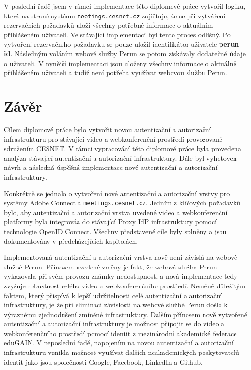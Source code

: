 \documentclass[
  printed, %
  twoside, %
  table,   %
  nolof,     %
  nolot,     %
]{fithesis3}
\begin{document}
V poslední řadě jsem v rámci implementace této diplomové práce vytvořil logiku, která na straně systému \texttt{meetings.cesnet.cz} zajišťuje, že se při vytváření rezervačních požadavků uloží všechny potřebné informace o aktuálním přihlášeném uživateli. Ve stávající implementaci byl tento proces odlišný. Po vytvoření rezervačního požadavku se pouze uložil identifikátor uživatele \textbf{perun id}. Následným voláním webové služby Perun se potom získávaly dodatečné údaje o uživateli. V nynější implementaci jsou uloženy všechny informace o aktuálně přihlášeném uživateli a tudíž není potřeba využívat webovou službu Perun. 

\chapter{Závěr}
Cílem diplomové práce bylo vytvořit novou autentizační a autorizační infrastrukturu pro stávající video a webkonferenční prostředí provozované sdružením CESNET. V rámci vypracování této diplomové práce byla provedena analýza stávající autentizační a autorizační infrastruktury. Dále byl vyhotoven návrh a následná úspěšná implementace nové autentizační a autorizační infrastruktury.  

\par 

Konkrétně se jednalo o vytvoření nové autentizační a autorizační vrstvy pro systémy Adobe Connect a \texttt{meetings.cesnet.cz}. Jedním z klíčových požadavků bylo, aby autentizační a autorizační vrstva uvedené video a webkonferenční platformy byla integrováa do stávající Proxy IdP infrastruktury pomocí technologie OpenID Connect. Všechny představené cíle byly splněny a jsou dokumentovány v předcházejících kapitolách. 

\par
Implementovaná autentizační a autorizační vrstva nově není závislá na webové službě Perun. Přínosem uvedené změny je fakt, že webová služba Perun vykazovala při svém provozu známky nedostupnosti a nová implementace tedy zvyšuje robustnost celého video a webkonferenčního prostředí. Neméně důležitým faktem, který přispívá k lepší udržitelnosti celé autentizační a autorizační infrastruktury, je že při eliminaci závislosti na webové službě Perun došlo k výraznému zjednodušení zmíněné infrastruktury. Dalším přínosem nově vytvořené autentizační a autorizační infrastruktury je možnost připojit se do video a webkonferenčního prostředí pomocí identit z mezinárodní akademické federace eduGAIN. V neposlední řadě, napojením na novou autentizační a autorizační infrastrukturu vznikla možnost využívat dalších neakademických poskytovatelů identit jako jsou společnosti Google, Facebook, LinkedIn a Github. 
\end{document}
